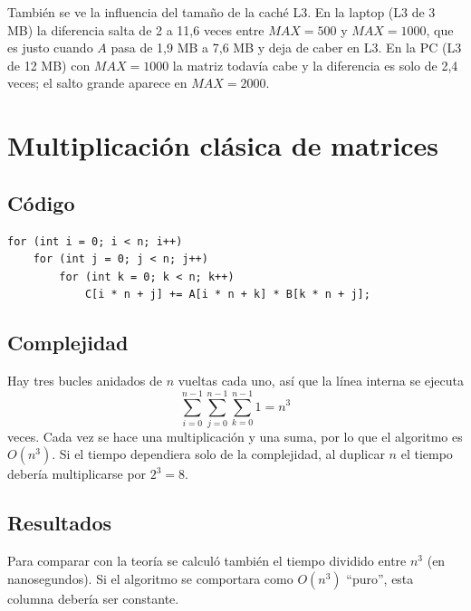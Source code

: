 \documentclass[11pt]{article}
\begin{document}
También se ve la influencia del tamaño de la caché L3. En la laptop (L3 de
3 MB) la diferencia salta de 2 a 11,6 veces entre $\mathit{MAX}=500$ y
$\mathit{MAX}=1000$, que es justo cuando $A$ pasa de 1,9 MB a 7,6 MB y deja
de caber en L3. En la PC (L3 de 12 MB) con $\mathit{MAX}=1000$ la matriz
todavía cabe y la diferencia es solo de 2,4 veces; el salto grande aparece
en $\mathit{MAX}=2000$.

\section{Multiplicación clásica de matrices}

\subsection{Código}

\begin{lstlisting}[caption={Multiplicación clásica (\texttt{clasica.cpp}).}]
for (int i = 0; i < n; i++)
    for (int j = 0; j < n; j++)
        for (int k = 0; k < n; k++)
            C[i * n + j] += A[i * n + k] * B[k * n + j];
\end{lstlisting}

\subsection{Complejidad}

Hay tres bucles anidados de $n$ vueltas cada uno, así que la línea interna
se ejecuta
\[
\sum_{i=0}^{n-1}\sum_{j=0}^{n-1}\sum_{k=0}^{n-1} 1 = n^3
\]
veces. Cada vez se hace una multiplicación y una suma, por lo que el
algoritmo es $O(n^3)$. Si el tiempo dependiera solo de la complejidad, al
duplicar $n$ el tiempo debería multiplicarse por $2^3 = 8$.

\subsection{Resultados}

Para comparar con la teoría se calculó también el tiempo dividido entre
$n^3$ (en nanosegundos). Si el algoritmo se comportara como $O(n^3)$
``puro'', esta columna debería ser constante.
\end{document}
